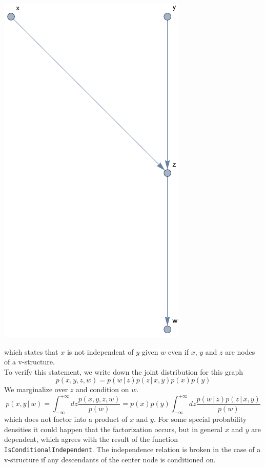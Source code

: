 \documentclass{tstextbook}
\begin{document}
\begin{example}
\includegraphics[scale=0.8, center]{images/v_structure_with_descendant.pdf}

which states that $x$ is not independent of $y$ given $w$ even if $x$, $y$ and $z$ are nodes of a v-structure.\\

To verify this statement, we write down the joint distribution for this graph
\begin{equation}
p(x,y,z,w)=p(w\,\vert\, z)p(z\,\vert\, x,y)p(x)p(y)
\end{equation}
We marginalize over $z$ and condition on $w$.
\begin{equation}
p(x,y\,\vert\,w)=\int_{-\infty}^{+\infty}dz \frac{p(x,y,z,w)}{p(w)}=p(x)p(y)\int_{-\infty}^{+\infty}dz \frac{p(w\,\vert\, z)p(z\,\vert\, x,y)}{p(w)}
\end{equation}
which does not factor into a product of $x$ and $y$. For some special probability densities it could happen that the factorization occurs, but in general $x$ and $y$ are dependent, which agrees with the result of the function \texttt{IsConditionalIndependent}. The independence relation is broken in the case of a v-structure if any descendants of the center node is conditioned on.
\end{example}
\end{document}
